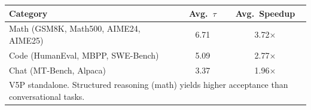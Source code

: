 \centering
\begin{tabular}{l|cc}
\toprule
Category & Avg.\ $\tau$ & Avg.\ Speedup \\
\midrule
Math (GSM8K, Math500, AIME24, AIME25) & 6.71 & 3.72$\times$ \\
Code (HumanEval, MBPP, SWE-Bench) & 5.09 & 2.77$\times$ \\
Chat (MT-Bench, Alpaca) & 3.37 & 1.96$\times$ \\
\midrule
\multicolumn{3}{l}{\footnotesize V5P standalone. Structured reasoning (math) yields higher acceptance than conversational tasks.} \\
\bottomrule
\end{tabular}
